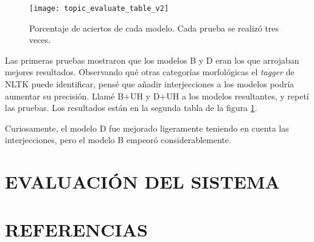 \documentclass{pre-tfg}
\begin{document}
\begin{figure}
	\caption{Porcentaje de aciertos de cada modelo. Cada prueba se realizó tres veces.}
	\label{table:topic_evaluation}
	\texttt{[image: topic\_evaluate\_table\_v2]}
	\centering
\end{figure}

Las primeras pruebas mostraron que los modelos B y D eran los que arrojaban mejores resultados. Observando qué otras categorías morfológicas el \textit{tagger} de NLTK puede identificar, pensé que añadir interjecciones a los modelos podría aumentar su precisión. Llamé B+UH y D+UH a los modelos resultantes, y repetí las pruebas. Los resultados están en la segunda tabla de la figura \ref{table:topic_evaluation}.

Curiosamente, el modelo D fue mejorado ligeramente teniendo en cuenta las interjecciones, pero el modelo B empeoró considerablemente.

\section{EVALUACIÓN DEL SISTEMA}


\section{REFERENCIAS}





\singlespacing
%

\end{document}
